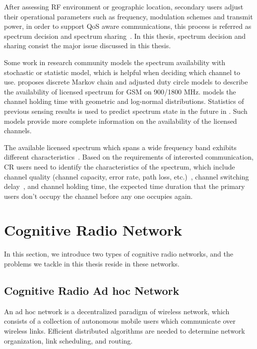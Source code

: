 After assessing RF environment or geographic location, secondary users adjust their operational parameters such as frequency, modulation schemes and transmit power, in order to support QoS aware communications, this process is referred as spectrum decision and spectrum sharing~\cite{08crn_survey}.
In this thesis, spectrum decision and sharing consist the major issue discussed in this thesis.

Some work in research community models the spectrum availability with stochastic or statistic model, which is helpful when deciding which channel to use.
\cite{Discrete-Time_Spectrum_Occupancy_Model_DySPAN_2011} proposes discrete Markov chain and adjusted duty circle models to describe the availability of licensed spectrum for GSM on 900/1800 MHz.
\cite{Wellens200910} models the channel holding time with geometric and log-normal distributions.
Statistics of previous sensing results is used to predict spectrum state in the future in \cite{spectrum-discovery-tmc08}.
Such models provide more complete information on the availability of the licensed channels.

The available licensed spectrum which spans a wide frequency band exhibits different characteristics~\cite{spectrum_decision_TMC11}.
Based on the requirements of interested communication, CR users need to identify the characteristics of the spectrum, which include channel quality (channel capacity, error rate, path loss, etc.)~\cite{spectrum_decision_TMC11}, channel switching delay~\cite{channel_switch_delay11}, and channel holding time, \ie the expected time duration that the primary users don't occupy the channel before any one occupies again.


\section{Cognitive Radio Network}
In this section, we introduce two types of cognitive radio networks, and the problems we tackle in this thesis reside in these networks.

\subsection{Cognitive Radio Ad hoc Network}
An ad hoc network is a decentralized paradigm of wireless network, which consists of a collection of autonomous mobile users which communicate over wireless links.
Efficient distributed algorithms are needed to determine network organization, link scheduling, and routing.

